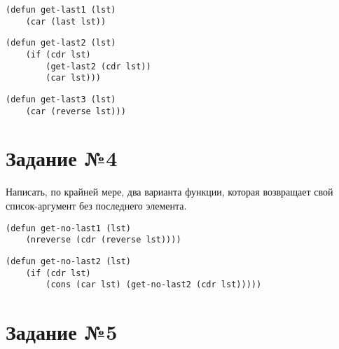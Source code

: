 \vspace{4mm}
\begin{minipage}{0.92\linewidth}
\begin{lstlisting}
(defun get-last1 (lst)
    (car (last lst))
\end{lstlisting}
\end{minipage}

\vspace{4mm}
\begin{minipage}{0.92\linewidth}
\begin{lstlisting}
(defun get-last2 (lst)
    (if (cdr lst)
        (get-last2 (cdr lst))
        (car lst)))
\end{lstlisting}
\end{minipage}

\vspace{4mm}
\begin{minipage}{0.92\linewidth}
\begin{lstlisting}
(defun get-last3 (lst)
    (car (reverse lst)))
\end{lstlisting}
\end{minipage}

\section{Задание №4}

Написать, по крайней мере, два варианта функции, которая возвращает свой
список-аргумент без последнего элемента.

\vspace{4mm}
\begin{minipage}{0.92\linewidth}
\begin{lstlisting}
(defun get-no-last1 (lst)
    (nreverse (cdr (reverse lst))))
\end{lstlisting}
\end{minipage}

\vspace{4mm}
\begin{minipage}{0.92\linewidth}
\begin{lstlisting}
(defun get-no-last2 (lst)
    (if (cdr lst)
        (cons (car lst) (get-no-last2 (cdr lst)))))
\end{lstlisting}
\end{minipage}

\section{Задание №5}

